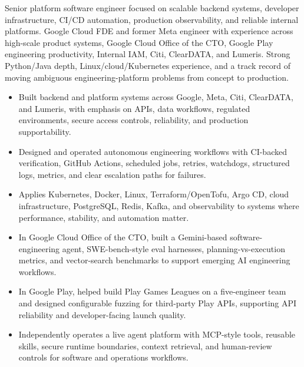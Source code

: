 


Senior platform software engineer focused on scalable backend systems, developer infrastructure, CI/CD automation, production observability, and reliable internal platforms. Google Cloud FDE and former Meta engineer with experience across high-scale product systems, Google Cloud Office of the CTO, Google Play engineering productivity, Internal IAM, Citi, ClearDATA, and Lumeris. Strong Python/Java depth, Linux/cloud/Kubernetes experience, and a track record of moving ambiguous engineering-platform problems from concept to production.
\begin{itemize}
  \item Built backend and platform systems across Google, Meta, Citi, ClearDATA, and Lumeris, with emphasis on APIs, data workflows, regulated environments, secure access controls, reliability, and production supportability.
  \item Designed and operated autonomous engineering workflows with CI-backed verification, GitHub Actions, scheduled jobs, retries, watchdogs, structured logs, metrics, and clear escalation paths for failures.
  \item Applies Kubernetes, Docker, Linux, Terraform/OpenTofu, Argo CD, cloud infrastructure, PostgreSQL, Redis, Kafka, and observability to systems where performance, stability, and automation matter.
\end{itemize}
\begin{itemize}
  \item In Google Cloud Office of the CTO, built a Gemini-based software-engineering agent, SWE-bench-style eval harnesses, planning-vs-execution metrics, and vector-search benchmarks to support emerging AI engineering workflows.
  \item In Google Play, helped build Play Games Leagues on a five-engineer team and designed configurable fuzzing for third-party Play APIs, supporting API reliability and developer-facing launch quality.
  \item Independently operates a live agent platform with MCP-style tools, reusable skills, secure runtime boundaries, context retrieval, and human-review controls for software and operations workflows.
\end{itemize}




